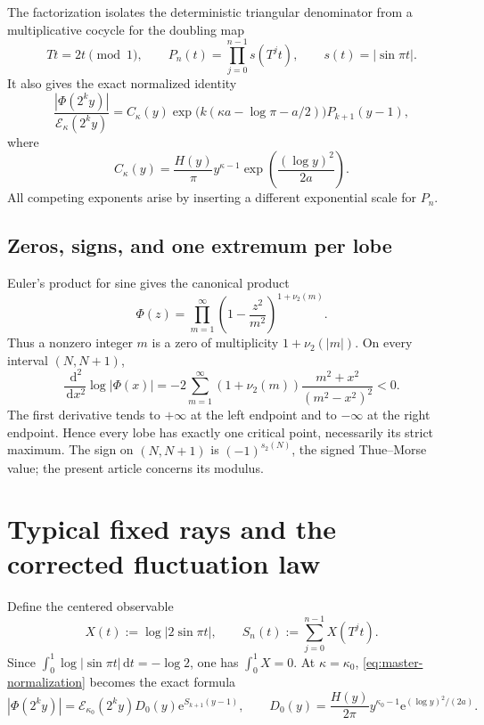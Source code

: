 \documentclass[11pt]{article}
\theoremstyle{definition}
\theoremstyle{remark}
\newcommand{\e}{\mathrm e}
\newcommand{\dd}{\,\mathrm d}
\newcommand{\vtwo}{\nu_2}
\newcommand{\T}{T}
\newcommand{\Ecal}{\mathcal E}
\begin{document}
The factorization isolates the deterministic triangular denominator from a
multiplicative cocycle for the doubling map
\begin{equation}
 \T t=2t\pmod1,
 \qquad
 P_n(t)=\prod_{j=0}^{n-1}s(\T^jt),
 \qquad s(t)=|\sin\pi t|.
 \label{eq:doubling}
\end{equation}
It also gives the exact normalized identity
\begin{equation}
 \frac{|\Phi(2^ky)|}{\Ecal_\kappa(2^ky)}
 =C_\kappa(y)
 \exp\!\bigl(k(\kappa a-\log\pi-a/2)\bigr)P_{k+1}(y-1),
 \label{eq:master-normalization}
\end{equation}
where
\begin{equation}
 C_\kappa(y)=\frac{H(y)}{\pi}
 y^{\kappa-1}\exp\!\left(\frac{(\log y)^2}{2a}\right).
 \label{eq:Ckappa}
\end{equation}
All competing exponents arise by inserting a different exponential scale for
\(P_n\).

\subsection{Zeros, signs, and one extremum per lobe}

Euler's product for sine gives the canonical product
\begin{equation}
 \Phi(z)=\prod_{m=1}^{\infty}
 \left(1-\frac{z^2}{m^2}\right)^{1+\vtwo(m)}.
 \label{eq:canonical-product}
\end{equation}
Thus a nonzero integer \(m\) is a zero of multiplicity
\(1+\vtwo(|m|)\).  On every interval \((N,N+1)\),
\begin{equation}
 \frac{\dd^2}{\dd x^2}\log|\Phi(x)|
 =-2\sum_{m=1}^{\infty}(1+\vtwo(m))
 \frac{m^2+x^2}{(m^2-x^2)^2}<0.
 \label{eq:strict-log-concavity}
\end{equation}
The first derivative tends to \(+\infty\) at the left endpoint and to
\(-\infty\) at the right endpoint.  Hence every lobe has exactly one critical
point, necessarily its strict maximum.  The sign on \((N,N+1)\) is
\((-1)^{s_2(N)}\), the signed Thue--Morse value; the present article concerns
its modulus.

\section{Typical fixed rays and the corrected fluctuation law}
\label{sec:typical}

Define the centered observable
\begin{equation}
 X(t):=\log|2\sin\pi t|,
 \qquad
 S_n(t):=\sum_{j=0}^{n-1}X(\T^jt).
 \label{eq:X-S}
\end{equation}
Since \(\int_0^1\log|\sin\pi t|\dd t=-\log2\), one has
\(\int_0^1X=0\).  At \(\kappa=\kappa_0\),
\eqref{eq:master-normalization} becomes the exact formula
\begin{equation}
 |\Phi(2^ky)|
 =\Ecal_{\kappa_0}(2^ky)D_0(y)\e^{S_{k+1}(y-1)},
 \qquad
 D_0(y)=\frac{H(y)}{2\pi}
 y^{\kappa_0-1}\e^{(\log y)^2/(2a)}.
 \label{eq:typical-exact}
\end{equation}
\end{document}
